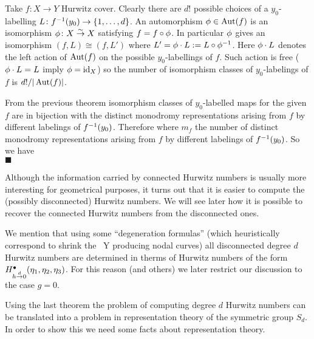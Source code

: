 \documentclass[10pt]{beamer}
\begin{document}
\begin{frame}


	
	Take $f\colon X\to Y$ Hurwitz cover. Clearly there are $d!$ possible choices of a $y_0$-labelling $L\colon f^{-1}(y_0)\to \{1,\ldots,d\}$. An automorphism $\phi\in\operatorname{Aut}(f)$ is an isomorphism $\phi\colon X\overset\sim\to X$ satisfying $f=f\circ\phi$. In particular $\phi$ gives an isomorphism $(f,L)\cong(f,L')$ where $L'=\phi\cdot L:=L\circ\phi^{-1}$. Here $\phi\cdot L$ denotes the left action of $\operatorname{Aut}(f)$ on the possible $y_0$-labellings of $f$. Such action is free (\ie $\phi\cdot L=L$ imply $\phi=\textrm{id}_X$) so the number of isomorphism classes of $y_0$-labelings of $f$ is $d!/|\operatorname{Aut}(f)|$. 
	
	From the previous theorem isomorphism classes of $y_0$-labelled maps for the given $f$ are in bijection with the distinct monodromy representations arising from $f$ by different labelings of $f^{-1}(y_0)$. Therefore 
	where $m_f$ the number of distinct monodromy representations arising from $f$ by different labelings of $f^{-1}(y_0)$. So we have
	\\[-5mm]
	\hfill$\blacksquare$
\end{frame}

\begin{frame}

Although the information carried by connected Hurwitz numbers is usually more interesting for geometrical purposes, it turns out that it is easier to compute the (possibly disconnected) Hurwitz numbers. We will see later how it is possible to recover the connected Hurwitz numbers from the disconnected ones. 

We mention that using some ``degeneration formulas'' (which heuristically correspond to shrink the \rs\ Y producing nodal curves) all disconnected degree $d$ Hurwitz numbers are determined in therms of Hurwitz numbers of the form $H^\bullet_{h\overset d\to0}(\eta_1,\eta_2,\eta_3)$. For this reason (and others) we later restrict our discussion to the case $g=0$. 



Using the last theorem the problem of computing degree $d$ Hurwitz numbers can be translated into a problem in representation theory of the symmetric group $S_d$. In order to show this we need some facts about representation theory. 

\end{frame}
\end{document}
